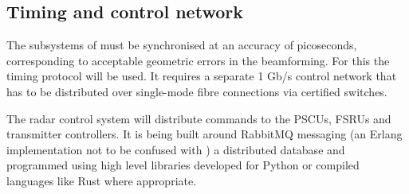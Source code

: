 \documentclass[12pt,a4paper]{article}
\begin{document}


% 
% 
% 
%

\subsection{Timing and control network}
\label{sec:control}

The subsystems of \ED must be synchronised at an accuracy of picoseconds, corresponding to acceptable geometric errors in the beamforming. For this the \WR timing protocol 
will be used. It requires a separate 1 Gb/s control network that has to be distributed over single-mode fibre connections via certified \WR switches.

The radar control system will distribute commands to the PSCUs, FSRUs and transmitter controllers. 
It is being built around RabbitMQ messaging (an Erlang implementation not to be confused with \WR) a distributed database and programmed using high level libraries developed for Python or compiled languages like Rust where appropriate. 
\end{document}
